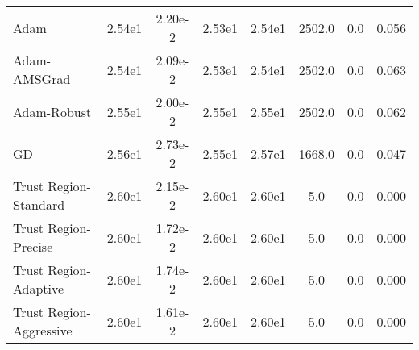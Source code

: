 \documentclass{article}
\begin{document}
\begin{table}[htbp]
{\begin{tabular}{p{2.5cm}*{7}{c}}
Adam & 2.54e1 & 2.20e-2 & 2.53e1 & 2.54e1 & 2502.0 & 0.0 & 0.056 \\
Adam-AMSGrad & 2.54e1 & 2.09e-2 & 2.53e1 & 2.54e1 & 2502.0 & 0.0 & 0.063 \\
Adam-Robust & 2.55e1 & 2.00e-2 & 2.55e1 & 2.55e1 & 2502.0 & 0.0 & 0.062 \\
GD & 2.56e1 & 2.73e-2 & 2.55e1 & 2.57e1 & 1668.0 & 0.0 & 0.047 \\
Trust Region-Standard & 2.60e1 & 2.15e-2 & 2.60e1 & 2.60e1 & 5.0 & 0.0 & 0.000 \\
Trust Region-Precise & 2.60e1 & 1.72e-2 & 2.60e1 & 2.60e1 & 5.0 & 0.0 & 0.000 \\
Trust Region-Adaptive & 2.60e1 & 1.74e-2 & 2.60e1 & 2.60e1 & 5.0 & 0.0 & 0.000 \\
Trust Region-Aggressive & 2.60e1 & 1.61e-2 & 2.60e1 & 2.60e1 & 5.0 & 0.0 & 0.000 \\
\bottomrule
\end{tabular}
}
\end{table}
\end{document}
